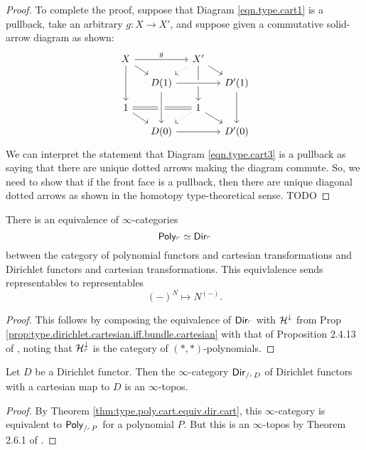 \begin{proof}
To complete the proof, suppose that Diagram \ref{eqn.type.cart1} is a pullback, take an arbitrary $g\colon X\to X'$, and suppose given a commutative solid-arrow diagram as shown:
\[
\begin{tikzcd}[sep=small]
  X\ar[rr, "g"]\ar[dd]\ar[rd]&&
  X'\ar[dr]\ar[dd]\ar[dl, dotted]\\&
  D(1)\ar[rr, crossing over]&&
  D'(1)\ar[dd]\\
  1\ar[dr]\ar[rr, equal]&&
  1\ar[dr]\ar[dl, dotted]\\&
  D(0)\ar[from=uu, crossing over]\ar[rr]&&
  D'(0)
\end{tikzcd}
\]
We can interpret the statement that Diagram \ref{eqn.type.cart3} is a pullback as
saying that there are unique dotted arrows making the diagram commute. So, we
need to show that if the front face is a pullback, then there are unique
diagonal dotted arrows as shown in the homotopy type-theoretical sense.
{\color{red} TODO} 
\end{proof}

\begin{thm}\label{thm:type.poly.cart.equiv.dir.cart}
  There is an equivalence of $\infty$-categories
  $$\mathsf{{Poly}}_{\ulcorner} \simeq \operatorname{\mathsf{{Dir}}}_{\ulcorner}$$
  between the category of polynomial functors and cartesian transformations and
  Dirichlet functors and cartesian transformations. This equivlalence sends
  representables to representables
  $$(-)^N \mapsto N^{(-)}.$$
\end{thm}
\begin{proof}
This follows by composing the equivalence of $\operatorname{\mathsf{{Dir}}}_{\ulcorner}$ with
$\operatorname{\mathcal{H}}^{\mathbin{\downarrow}}$ from Prop
\ref{prop:type.dirichlet.cartesian.iff.bundle.cartesian} with that of
Proposition 2.4.13 of \cite{GHK:Analytic.Monads}, noting that
$\operatorname{\mathcal{H}}^{\mathbin{\downarrow}}_{\ulcorner}$ is the category of $(\ast,\ast)$-polynomials. 
\end{proof}

\begin{cor}
  Let $D$ be a Dirichlet functor. Then the $\infty$-category
  $\operatorname{\mathsf{{Dir}}}_{/_{\ulcorner} D}$
  of Dirichlet functors with a cartesian map to $D$ is an $\infty$-topos.
\end{cor}
\begin{proof}
By Theorem \ref{thm:type.poly.cart.equiv.dir.cart}, this $\infty$-category is equivalent
to $\mathsf{{Poly}}_{/_{\ulcorner} P}$ for a polynomial $P$. But this is an
$\infty$-topos by Theorem 2.6.1 of \cite{GHK:Analytic.Monads}.
\end{proof}

